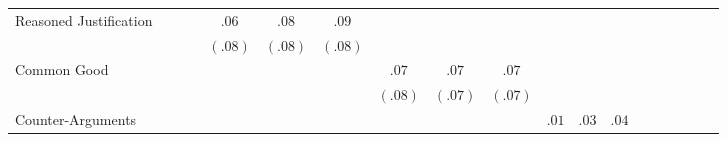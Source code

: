 \begin{landscape}
\begin{table}[!htb]
{\begin{tabular}{l c c c c c c c c c c c c c c c c c c }
			\quad Reasoned Justification                &                            &                            &                       & $.06$                      & $.08$                      & $.09$                 &                           &                            &                       &                            &                           &                            &                           &                            &                            &                            &                            &                       \\
			&                            &                            &                       & $(.08)$                    & $(.08)$                    & $(.08)$               &                           &                            &                       &                            &                           &                            &                           &                            &                            &                            &                            &                       \\
			\quad Common Good                           &                            &                            &                       &                            &                            &                       & $.07$                     & $.07$                      & $.07$                 &                            &                           &                            &                           &                            &                            &                            &                            &                       \\
			&                            &                            &                       &                            &                            &                       & $(.08)$                   & $(.07)$                    & $(.07)$               &                            &                           &                            &                           &                            &                            &                            &                            &                       \\
			\quad Counter-Arguments                     &                            &                            &                       &                            &                            &                       &                           &                            &                       & $.01$                      & $.03$                     & $.04$                      &                           &                            &                            &                            &                            &                       \\

\end{tabular}}
\end{table}
\end{landscape}
